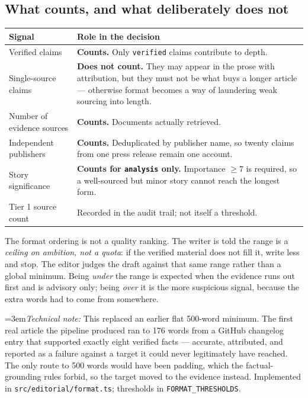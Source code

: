 \documentclass[11pt,a4paper]{article}
\newcommand{\file}[1]{\textcolor{aitkGray}{\texttt{\footnotesize\hyphenpenalty=0\exhyphenpenalty=0\relax #1}}}
\newcommand{\brk}{\hyphenpenalty=0\exhyphenpenalty=0\relax}
\newcommand{\code}[1]{\texttt{\small\brk #1}}
\newcommand{\technote}[1]{\par\vspace{-0.25em}\begingroup\footnotesize\color{aitkGray}\sloppy\emergencystretch=3em\textit{Technical note:} #1\par\endgroup}
\begin{document}
\subsection{What counts, and what deliberately does not}

\begin{center}
\small
\begin{tabularx}{\textwidth}{@{}p{5.0cm} >{\RaggedRight}X@{}}
\toprule
\textbf{Signal} & \textbf{Role in the decision} \\
\midrule
Verified claims & \textbf{Counts.} Only \code{verified} claims contribute to
  depth. \\
Single-source claims & \textbf{Does not count.} They may appear in the prose with
  attribution, but they must not be what buys a longer article --- otherwise
  format becomes a way of laundering weak sourcing into length. \\
Number of evidence sources & \textbf{Counts.} Documents actually retrieved. \\
Independent publishers & \textbf{Counts.} Deduplicated by publisher name, so
  twenty claims from one press release remain one account. \\
Story significance & \textbf{Counts for \code{analysis} only.} Importance $\geq 7$
  is required, so a well-sourced but minor story cannot reach the longest form. \\
Tier 1 source count & Recorded in the audit trail; not itself a threshold. \\
\bottomrule
\end{tabularx}
\end{center}

\begin{gobox}
The format ordering is not a quality ranking. The writer is told the range is a
\emph{ceiling on ambition, not a quota}: if the verified material does not fill
it, write less and stop. The editor judges the draft against that same range
rather than a global minimum. Being \emph{under} the range is expected when the
evidence runs out first and is advisory only; being \emph{over} it is the more
suspicious signal, because the extra words had to come from somewhere.
\end{gobox}

\technote{This replaced an earlier flat 500-word minimum. The first real article
the pipeline produced ran to 176 words from a GitHub changelog entry that
supported exactly eight verified facts --- accurate, attributed, and reported as a
failure against a target it could never legitimately have reached. The only route
to 500 words would have been padding, which the factual-grounding rules forbid, so
the target moved to the evidence instead. Implemented in
\file{src/editorial/format.ts}; thresholds in \code{FORMAT\_THRESHOLDS}.}
\end{document}
